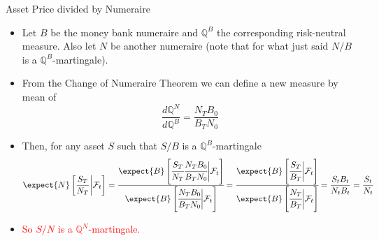 \documentclass{beamer}
\begin{document}
\begin{frame}{Asset Price divided by Numeraire}
	\begin{itemize}
 	\item<1-> Let $B$ be the money bank numeraire and $\mathbb{Q}^B$ the corresponding risk-neutral measure. Also let $N$ be another numeraire (note that for what just said $N/B$ is a $\mathbb{Q}^B$-martingale). 
	\item<2-> From the Change of Numeraire Theorem we can define a new measure by mean of
  \begin{equation*}
    \frac{d\mathbb{Q}^N}{d\mathbb{Q}^B} = \frac{N_TB_0}{B_TN_0}
  \end{equation*}
	\item<3-> Then, for any asset $S$ such that $S/B$ is a $\mathbb{Q}^B$-martingale
  \begin{equation*}
    \expect{N}\left[\frac{S_T}{N_T}\bigg|\mathcal{F}_t\right] = \cfrac{\expect{B}\left[\cfrac{S_T}{N_T}\cfrac{N_TB_0}{B_TN_0}\bigg|\mathcal{F}_t\right]}{\expect{B}\left[\cfrac{N_TB_0}{B_TN_0}\bigg|\mathcal{F}_t\right]}
    =\cfrac{\expect{B}\left[\cfrac{S_T}{B_T}\bigg|\mathcal{F}_t\right]}
    {\expect{B}\left[\cfrac{N_T}{B_T}\bigg|\mathcal{F}_t\right]}
    =\frac{S_tB_t}{N_tB_t}=\frac{S_t}{N_t}
  \end{equation*}
	\item<4-> \textcolor{red}{So $S/N$ is a $\mathbb{Q}^N$-martingale.}
	\end{itemize}
\end{frame}
\end{document}
